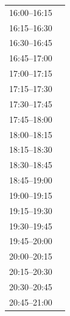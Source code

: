 \documentclass[11pt,a4paper]{article}
\begin{document}
\begin{center}
\begin{adjustbox}{max totalsize={\textwidth}{0.82\textheight},center}
\begin{tabular}{|p{3.6cm}|p{11cm}|}
\cline{1-1}
{\centering\rule{0pt}{2.80ex}16:00--16:15} & {\centering\rule{0pt}{2.80ex}} \\
\cline{1-1}
{\centering\rule{0pt}{2.80ex}16:15--16:30} & {\centering\rule{0pt}{2.80ex}} \\
\cline{1-1}
{\centering\rule{0pt}{2.80ex}16:30--16:45} & {\centering\rule{0pt}{2.80ex}} \\
\cline{1-1}
{\centering\rule{0pt}{2.80ex}16:45--17:00} & {\centering\rule{0pt}{2.80ex}} \\
\cline{1-1}
{\centering\rule{0pt}{2.80ex}17:00--17:15} & {\centering\rule{0pt}{2.80ex}} \\
\cline{1-1}
{\centering\rule{0pt}{2.80ex}17:15--17:30} & {\centering\rule{0pt}{2.80ex}} \\
\cline{1-1}
{\centering\rule{0pt}{2.80ex}17:30--17:45} & {\centering\rule{0pt}{2.80ex}} \\
\cline{1-1}
{\centering\rule{0pt}{2.80ex}17:45--18:00} & {\centering\rule{0pt}{2.80ex}} \\
\cline{1-1}
{\centering\rule{0pt}{2.80ex}18:00--18:15} & {\centering\rule{0pt}{2.80ex}} \\
\cline{1-1}
{\centering\rule{0pt}{2.80ex}18:15--18:30} & {\centering\rule{0pt}{2.80ex}} \\
\cline{1-1}
{\centering\rule{0pt}{2.80ex}18:30--18:45} & {\centering\rule{0pt}{2.80ex}} \\
\cline{1-1}
{\centering\rule{0pt}{2.80ex}18:45--19:00} & {\centering\rule{0pt}{2.80ex}} \\
\cline{1-1}
{\centering\rule{0pt}{2.80ex}19:00--19:15} & {\centering\rule{0pt}{2.80ex}} \\
\cline{1-1}
{\centering\rule{0pt}{2.80ex}19:15--19:30} & {\centering\rule{0pt}{2.80ex}} \\
\cline{1-1}
{\centering\rule{0pt}{2.80ex}19:30--19:45} & {\centering\rule{0pt}{2.80ex}} \\
\cline{1-1}
{\centering\rule{0pt}{2.80ex}19:45--20:00} & {\centering\rule{0pt}{2.80ex}} \\
\cline{1-1}
{\centering\rule{0pt}{2.80ex}20:00--20:15} & {\centering\rule{0pt}{2.80ex}} \\
\cline{1-1}
{\centering\rule{0pt}{2.80ex}20:15--20:30} & {\centering\rule{0pt}{2.80ex}} \\
\cline{1-1}
{\centering\rule{0pt}{2.80ex}20:30--20:45} & {\centering\rule{0pt}{2.80ex}} \\
\cline{1-1}
{\centering\rule{0pt}{2.80ex}20:45--21:00} & {\centering\rule{0pt}{2.80ex}} \\

\end{tabular}
\end{adjustbox}
\end{center}
\end{document}
